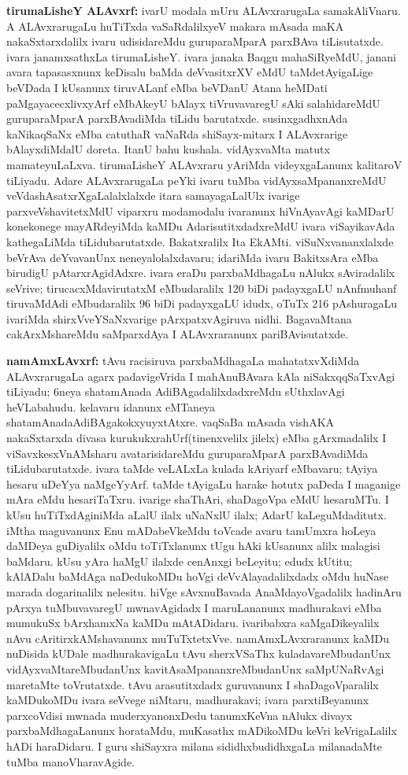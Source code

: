 {\large\textbf{tirumaLisheY ALAvxrf:}} ivarU modala mUru ALAvxrarugaLa samakAliVnaru. A ALAvxrarugaLu huTiTxda vaSaRdalilxyeV makara mAsada maKA nakaSxtarxdalilx ivaru udisidareMdu guruparaMparA parxBAva tiLisutatxde. ivara janamxsathxLa tirumaLisheY. ivara janaka Baqgu mahaSiRyeMdU, janani avara tapasasxnunx keDisalu baMda deVvasitxrXV eMdU taMdetAyigaLige beVDada I kUsanunx tiruvALanf eMba beVDanU Atana heMDati paMgayacecxlivxyArf eMbAkeyU bAlayx tiVruvavaregU sAki salahidareMdU guruparaMparA parxBAvadiMda tiLidu barutatxde. susinxgadhxnAda kaNikaqSaNx eMba catuthaR vaNaRda shiSayx-mitarx I ALAvxrarige bAlayxdiMdalU doreta. ItanU bahu kushala. vidAyxvaMta matutx mamateyuLaLxva. tirumaLisheY ALAvxraru yAriMda videyxgaLanunx kalitaroV tiLiyadu. Adare ALAvxrarugaLa peYki ivaru tuMba vidAyxsaMpananxreMdU veVdashAsatxrXgaLalalxlalxde itara samayagaLalUlx ivarige parxveVshavitetxMdU viparxru modamodalu ivaranunx hiVnAyavAgi kaMDarU konekonege mayARdeyiMda kaMDu AdarisutitxdadxreMdU ivara viSayikavAda kathegaLiMda tiLidubarutatxde. Bakatxralilx Ita EkAMti. viSuNxvananxlalxde beVrAva deYvavanUnx neneyalolalxdavaru; idariMda ivaru BakitxsAra eMba birudigU pAtarxrAgidAdxre. ivara eraDu parxbaMdhagaLu nAlukx sAviradalilx seVrive; tirucacxMdavirutatxM eMbudaralilx 120 biDi padayxgaLU nAnfmuhanf tiruvaMdAdi eMbudaralilx 96 biDi padayxgaLU idudx, oTuTx 216 pAshuragaLu ivariMda shirxVveYSaNxvarige pArxpatxvAgiruva nidhi. BagavaMtana cakArxMshareMdu saMparxdAya I ALAvxraranunx pariBAvisutatxde.

{\large\textbf{namAmxLAvxrf:}} tAvu racisiruva parxbaMdhagaLa mahatatxvXdiMda ALAvxrarugaLa agarx padavi\-geVrida I mahAnuBAvara kAla niSakxqqSaTxvAgi tiLiyadu; 6neya shatamAnada Adi\-BAgadalilxdadxreMdu sUthxlavAgi heVLabahudu. kelavaru idanunx eMTaneya shatamAnada\break AdiBAgakokxyuyxtAtxre. vaqSaBa mAsada vishAKA nakaSxtarxda divasa kurukukxrahUrf\break (tinenxvelilx jilelx) eMba gArxmadalilx I viSavxkesxVnAMsharu avatarisidareMdu guru\-paraMparA parxBAvadiMda tiLidubarutatxde. ivara taMde veLALxLa kulada kAriyarf eMbavaru; tAyiya hesaru uDeYya naMgeYyArf. taMde tAyigaLu harake hotutx paDeda I maganige mAra eMdu hesariTaTxru. ivarige shaThAri, shaDagoVpa eMdU hesaruMTu. I kUsu huTiTxdAginiMda aLalU ilalx uNaNxlU ilalx; AdarU kaLeguMdaditutx. iMtha maguvanunx Enu mADabeVkeMdu toVcade avaru tamUmxra hoLeya daMDeya guDiyalilx oMdu toTiTxlanunx tUgu hAki kUsanunx alilx malagisi baMdaru. kUsu yAra haMgU ilalxde cenAnxgi beLeyitu; edudx kUtitu; kAlADalu baMdAga naDedukoMDu hoVgi deVvAlayadalilxdadx oMdu huNase marada dogarinalilx nelesitu. hiVge sAvxnuBavada AnaMdayoVgadalilx hadinAru pArxya tuMbuvavaregU mwnavAgidadx I maruLananunx madhurakavi eMba mumukuSx bArxhamxNa kaMDu mAtADidaru. ivaribabxra saMgaDikeyalilx nAvu cAritirxkAMshavanunx muTuTxtetxVve. namAmxLAvxraranunx kaMDu nuDisida kUDale madhurakavigaLu tAvu sherxVSaThx kuladavareMbudanUnx vidAyxvaMtareMbudanUnx kavitAsaMpananxreMbudanUnx saMpUNaRvAgi maretaMte toVrutatxde. tAvu arasutitxdadx guruvanunx I shaDagoVparalilx kaMDukoMDu ivara seVvege niMtaru, madhurakavi; ivara parxtiBeyanunx parxcoVdisi mwnada muderxyanonxDedu tanumxKeVna nAlukx divayx parxbaMdhagaLanunx horataMdu, muKasathx mADikoMDu keVri keVrigaLalilx hADi haraDidaru. I guru shiSayxra milana sididhxbudidhxgaLa milanadaMte tuMba manoVharavAgide.

